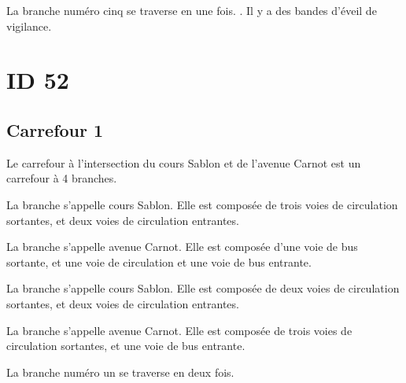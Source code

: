 \begin{appendix}
\newpar{}

La branche numéro cinq se traverse en une fois.  . Il y a des bandes d'éveil de vigilance.

\section*{ID 52}

\label{annexe:q_ID52}

\subsection*{Carrefour 1}

\label{annexe:q_ID52_carrefour1}

Le carrefour à l'intersection du cours Sablon et de l'avenue Carnot est un carrefour à 4 branches.


\newpar{}

La branche  s'appelle cours Sablon. Elle est composée de trois voies de circulation sortantes, et deux voies de circulation entrantes.

\newpar{}

La branche  s'appelle avenue Carnot. Elle est composée d'une voie de bus sortante, et une voie de circulation et une voie de bus entrante.

\newpar{}

La branche  s'appelle cours Sablon. Elle est composée de deux voies de circulation sortantes, et deux voies de circulation entrantes.

\newpar{}

La branche  s'appelle avenue Carnot. Elle est composée de trois voies de circulation sortantes, et une voie de bus entrante.

\newpar{}

La branche numéro un se traverse en deux fois.

\newpar{}


\end{appendix}
